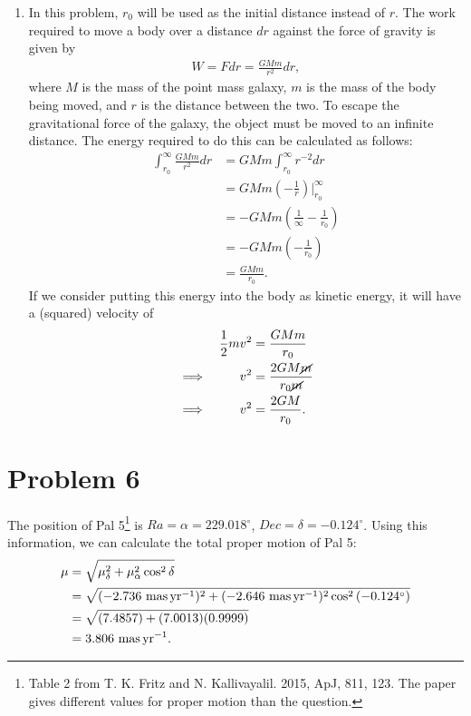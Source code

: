 \documentclass[11pt,letterpaper]{article}
\begin{document}
\begin{enumerate}[label=(\alph*)]
    \item In this problem, $r_0$ will be used as the initial distance instead of $r$. The work required to move a body over a distance $dr$ against the force of gravity is given by 
        \begin{align*}
            W = Fdr = \frac{GMm}{r^2}dr,
        \end{align*}
        where $M$ is the mass of the point mass galaxy, $m$ is the mass of the body being moved, and $r$ is the distance between the two. To escape the gravitational force of the galaxy, the object must be moved to an infinite distance. The energy required to do this can be calculated as follows:
        \begin{align*}
            \int_{r_0}^{\infty} \frac{GMm}{r^2}dr &= GMm \int_{r_0}^{\infty} r^{-2}dr \\
            &= GMm\left(-\frac{1}{r}\right)\Big|_{r_0}^{\infty} \\
            &= -GMm\left(\frac{1}{\infty} - \frac{1}{r_0}\right) \\
            &= -GMm\left(-\frac{1}{r_0}\right) \\
            &= \frac{GMm}{r_0}.
        \end{align*}
        If we consider putting this energy into the body as kinetic energy, it will have a (squared) velocity of 
        \begin{alignat*}{2}
            &&\frac{1}{2}mv^2 &= \frac{GMm}{r_0} \\
            \implies&&v^2 &= \frac{2GM\cancel{m}}{r_0\cancel{m}} \\
            \implies&&v^2 &= \frac{2GM}{r_0}.
        \end{alignat*}
\end{enumerate}

\section*{Problem 6} 

The position of Pal 5\footnote{Table 2 from T. K. Fritz and N. Kallivayalil. 2015, ApJ, 811, 123. The paper gives different values for proper motion than the question.} is $Ra=\alpha = 229.018^\circ$, $Dec = \delta = -0.124^\circ$. Using this information, we can calculate the total proper motion of Pal 5:
        \begin{align*}
            \mu &= \sqrt{\mu_\delta^2 + \mu_\alpha^2\cos^2{\delta}} \\
            &= \sqrt{(-2.736~{\rm mas\,yr^{-1}})^2 + (-2.646~{\rm mas\,yr^{-1}})^2\cos^2{(-0.124^\circ)}} \\
            &= \sqrt{(7.4857) + (7.0013)(0.9999)} \\
            &= 3.806~{\rm mas\,yr^{-1}}. 
        \end{align*}
\end{document}
